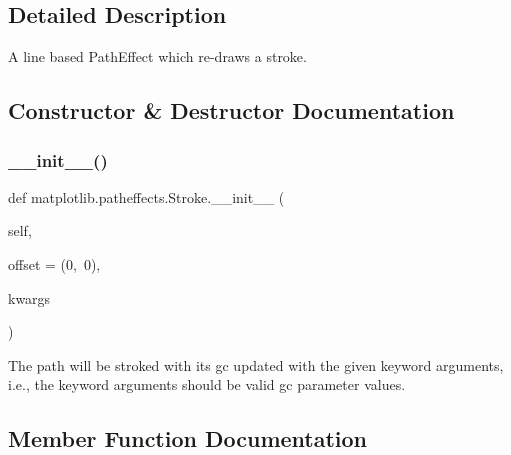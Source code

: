 \subsection{Detailed Description}
\begin{DoxyVerb}A line based PathEffect which re-draws a stroke.\end{DoxyVerb}
 

\subsection{Constructor \& Destructor Documentation}
\mbox{\label{classmatplotlib_1_1patheffects_1_1Stroke_a6c6c748a654ffe38c0163392bb1dfe82}} 
\subsubsection{\texorpdfstring{\+\_\+\+\_\+init\+\_\+\+\_\+()}{\_\_init\_\_()}}
{\footnotesize\ttfamily def matplotlib.\+patheffects.\+Stroke.\+\_\+\+\_\+init\+\_\+\+\_\+ (\begin{DoxyParamCaption}\item[{}]{self,  }\item[{}]{offset = {\ttfamily (0,~0)},  }\item[{}]{kwargs }\end{DoxyParamCaption})}

\begin{DoxyVerb}The path will be stroked with its gc updated with the given
keyword arguments, i.e., the keyword arguments should be valid
gc parameter values.
\end{DoxyVerb}
 

\subsection{Member Function Documentation}
\mbox{\label{classmatplotlib_1_1patheffects_1_1Stroke_aeb4f865ce65e6e4a625b4ca0e29c6b61}} 
